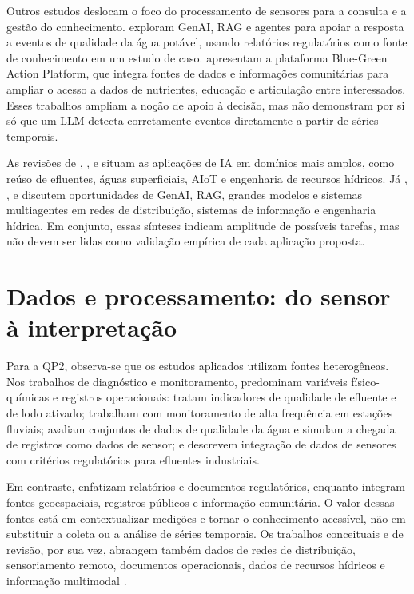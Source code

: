Outros estudos deslocam o foco do processamento de sensores para a consulta e a gestão do conhecimento.  exploram GenAI, RAG e agentes para apoiar a resposta a eventos de qualidade da água potável, usando relatórios regulatórios como fonte de conhecimento em um estudo de caso.  apresentam a plataforma Blue-Green Action Platform, que integra fontes de dados e informações comunitárias para ampliar o acesso a dados de nutrientes, educação e articulação entre interessados. Esses trabalhos ampliam a noção de apoio à decisão, mas não demonstram por si só que um LLM detecta corretamente eventos diretamente a partir de séries temporais.

As revisões de , ,  e  situam as aplicações de IA em domínios mais amplos, como reúso de efluentes, águas superficiais, AIoT e engenharia de recursos hídricos. Já , ,  e  discutem oportunidades de GenAI, RAG, grandes modelos e sistemas multiagentes em redes de distribuição, sistemas de informação e engenharia hídrica. Em conjunto, essas sínteses indicam amplitude de possíveis tarefas, mas não devem ser lidas como validação empírica de cada aplicação proposta.

\section{Dados e processamento: do sensor à interpretação}
\label{sec:ea-dados}

Para a QP2, observa-se que os estudos aplicados utilizam fontes heterogêneas. Nos trabalhos de diagnóstico e monitoramento, predominam variáveis físico-químicas e registros operacionais:  tratam indicadores de qualidade de efluente e de lodo ativado;  trabalham com monitoramento de alta frequência em estações fluviais;  avaliam conjuntos de dados de qualidade da água e simulam a chegada de registros como dados de sensor; e  descrevem integração de dados de sensores com critérios regulatórios para efluentes industriais.

Em contraste,  enfatizam relatórios e documentos regulatórios, enquanto  integram fontes geoespaciais, registros públicos e informação comunitária. O valor dessas fontes está em contextualizar medições e tornar o conhecimento acessível, não em substituir a coleta ou a análise de séries temporais. Os trabalhos conceituais e de revisão, por sua vez, abrangem também dados de redes de distribuição, sensoriamento remoto, documentos operacionais, dados de recursos hídricos e informação multimodal \cite{hosseini2026,taiwo2025,arslan2026,liang2026,liu2025,li2026,rahman2026,rashid2026}.

